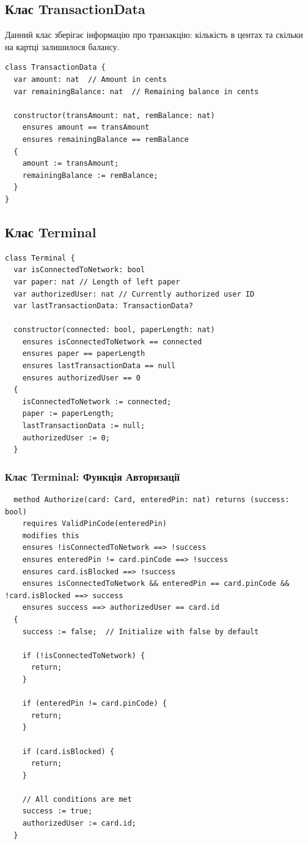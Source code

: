 \documentclass[12pt]{article}
\begin{document}
\subsection*{Клас TransactionData}

Данний клас зберігає інформацію про транзакцію: кількість в центах та
скільки на картці залишилося балансу.

\begin{lstlisting}
class TransactionData {
  var amount: nat  // Amount in cents
  var remainingBalance: nat  // Remaining balance in cents

  constructor(transAmount: nat, remBalance: nat)
    ensures amount == transAmount
    ensures remainingBalance == remBalance
  {
    amount := transAmount;
    remainingBalance := remBalance;
  }
}
\end{lstlisting}

\subsection*{Клас Terminal}

\begin{lstlisting}
class Terminal {
  var isConnectedToNetwork: bool
  var paper: nat // Length of left paper
  var authorizedUser: nat // Currently authorized user ID
  var lastTransactionData: TransactionData?

  constructor(connected: bool, paperLength: nat)
    ensures isConnectedToNetwork == connected
    ensures paper == paperLength
    ensures lastTransactionData == null
    ensures authorizedUser == 0
  {
    isConnectedToNetwork := connected;
    paper := paperLength;
    lastTransactionData := null;
    authorizedUser := 0;
  }
\end{lstlisting}

\subsubsection*{Клас Terminal: Функція Авторизації}

\begin{lstlisting}
  method Authorize(card: Card, enteredPin: nat) returns (success: bool)
    requires ValidPinCode(enteredPin)
    modifies this
    ensures !isConnectedToNetwork ==> !success
    ensures enteredPin != card.pinCode ==> !success
    ensures card.isBlocked ==> !success
    ensures isConnectedToNetwork && enteredPin == card.pinCode && !card.isBlocked ==> success
    ensures success ==> authorizedUser == card.id
  {
    success := false;  // Initialize with false by default

    if (!isConnectedToNetwork) {
      return;
    }

    if (enteredPin != card.pinCode) {
      return;
    }

    if (card.isBlocked) {
      return;
    }

    // All conditions are met
    success := true;
    authorizedUser := card.id;
  }
\end{lstlisting}
\end{document}
